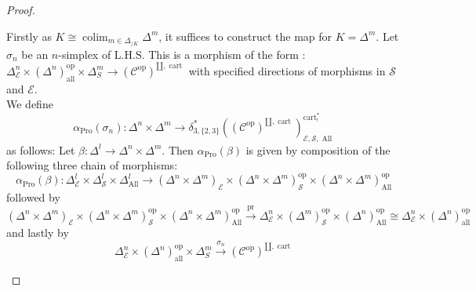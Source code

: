 \documentclass[14pt]{article}
\theoremstyle{definition}
\newcommand{\E}{\mathcal{E}}
\newcommand{\op}[1]{\operatorname{#1}}
\renewcommand{\S}{\mathcal{S}}
\newcommand{\Ca}{\mathcal{C}}
\numberwithin{subsection}{section}
\begin{document}
\begin{proof}
\begin{enumerate}
\begin{enumerate}
 Firstly as $K \cong \op{colim}_{m \in \Delta_{/K}}\Delta^m$, it suffices to construct the map for $K=\Delta^m$. Let $\sigma_n$ be an $n$-simplex of L.H.S. This is a morphism of the form :
 $\Delta^n_{\E} \times (\Delta^n)^{\op{op}}_{\op{all}} \times \Delta^m_S \to (\Ca^{\op{op}})^{\amalg,\op{cart}}$ with specified directions of morphisms in $\S$ and $\E$. \\
 We define \[\alpha_{\op{Pro}}(\sigma_n): \Delta^n \times \Delta^m \to \delta^*_{3,\{2,3\}}((\Ca^{\op{op}})^{\amalg,\op{cart}})^{\op{cart}^*_!}_{\E,\S,\op{All}} \]
 as follows:
 Let $\beta : \Delta^l \to \Delta^n \times \Delta^m$. Then $\alpha_{\op{Pro}}(\beta)$ is given by composition of the following three chain of morphisms: 
 \begin{equation}
     \alpha_{\op{Pro}}(\beta):\Delta^l_{\E} \times \Delta^l_{\S} \times \Delta^l_{\op{All}} \to (\Delta^n \times \Delta^m)_{\E} \times (\Delta^n \times \Delta^m)^{\op{op}}_{\S} \times (\Delta^n \times \Delta^m)^{\op{op}}_{\op{All}}
 \end{equation}
 followed by 
 \begin{equation}
     (\Delta^n \times \Delta^m)_{\E} \times (\Delta^n \times \Delta^m)^{\op{op}}_{\S} \times (\Delta^n \times \Delta^m)^{\op{op}}_{\op{All}} \xrightarrow{\op{pr}} \Delta^n_{\E} \times (\Delta^m)^{\op{op}}_{\S} \times (\Delta^n)^{\op{op}}_{\op{All}} \cong \Delta^n_{\E} \times (\Delta^n)^{\op{op}}_{\op{all}} 
 \end{equation}
 and lastly by
 \begin{equation}
     \Delta^n_{\E} \times(\Delta^n)^{\op{op}}_{\op{all}} \times \Delta^m_S \xrightarrow{\sigma_n} (\Ca^{\op{op}})^{\amalg,\op{cart}}
 \end{equation}
 

\end{enumerate}
\end{enumerate}
\end{proof}
\end{document}
